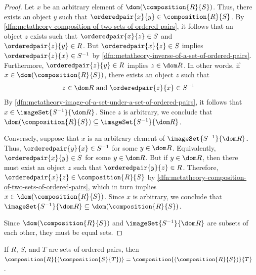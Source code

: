\begin{proof}
    Let \( x \) be an arbitrary element of \( \dom \mleft( \composition{R}{S} \mright) \).
    Thus, there exists an object \( y \) such that \( \orderedpair{x}{y} \in \composition{R}{S} \).
    By \cref{dfn:metatheory-composition-of-two-sets-of-ordered-pairs}, it follows that
    an object \( z \) exists such that \( \orderedpair{x}{z} \in S \) and \( \orderedpair{z}{y} \in R \).
    But \( \orderedpair{x}{z} \in S \) implies \( \orderedpair{z}{x} \in S^{-1} \) by \cref{dfn:metatheory-inverse-of-a-set-of-ordered-pairs}.
    Furthermore, \( \orderedpair{z}{y} \in R \) implies \( z \in \dom R \).
    In other words, if \( x \in \dom \mleft( \composition{R}{S} \mright) \), there exists an object \( z \)
    such that
    \begin{equation*}
        z \in \dom R \ \text{and} \ \orderedpair{z}{x} \in S^{-1}
    \end{equation*}
    By \cref{dfn:metatheory-image-of-a-set-under-a-set-of-ordered-pairs}, it follows that \( x \in \imageSet{S^{-1}}{\dom R} \).
    Since \( z \) is arbitrary, we conclude that \( \dom \mleft( \composition{R}{S} \mright) \subseteq \imageSet{S^{-1}}{\dom R} \).

    \vspace{0.3cm}
    \noindent
    Conversely, suppose that \( x \) is an arbitrary element of \( \imageSet{S^{-1}}{\dom R} \).
    Thus, \( \orderedpair{y}{x} \in S^{-1} \) for some \( y \in \dom R \).
    Equivalently, \( \orderedpair{x}{y} \in S \) for some \( y \in \dom R \).
    But if \( y \in \dom R \), then there must exist an object \( z \) such that \( \orderedpair{y}{z} \in R \).
    Therefore, \( \orderedpair{x}{z} \in \composition{R}{S} \) by \cref{dfn:metatheory-composition-of-two-sets-of-ordered-pairs},
    which in turn implies \( x \in \dom \mleft( \composition{R}{S} \mright) \).
    Since \( x \) is arbitrary, we conclude that \( \imageSet{S^{-1}}{\dom R} \subseteq \dom \mleft( \composition{R}{S} \mright) \).

    \vspace{0.3cm}
    \noindent
    Since \( \dom \mleft( \composition{R}{S} \mright) \) and \( \imageSet{S^{-1}}{\dom R} \) are subsets of each other, they must be equal sets.
\end{proof}

\begin{thm}
     \label{thm:metatheory-associativity-of-composition}
    If \( R \), \( S \), and \( T \) are sets of ordered pairs,
    then \( \composition{R}{\mleft( \composition{S}{T} \mright)} = \composition{\mleft( \composition{R}{S} \mright)}{T} \).
\end{thm}

